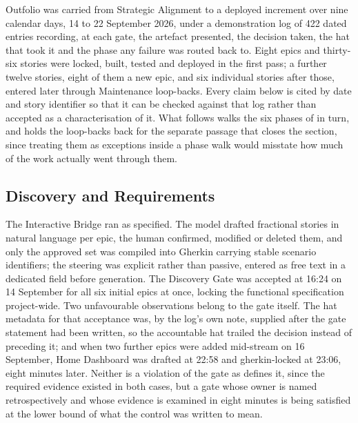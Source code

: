 
Outfolio was carried from Strategic Alignment to a deployed increment over nine calendar days, 14 to 22 September 2026, under a demonstration log of 422 dated entries recording, at each gate, the artefact presented, the decision taken, the hat that took it and the phase any failure was routed back to. Eight epics and thirty-six stories were locked, built, tested and deployed in the first pass; a further twelve stories, eight of them a new epic, and six individual stories after those, entered later through Maintenance loop-backs. Every claim below is cited by date and story identifier so that it can be checked against that log rather than accepted as a characterisation of it. What follows walks the six phases of  in turn, and holds the loop-backs back for the separate passage that closes the section, since treating them as exceptions inside a phase walk would misstate how much of the work actually went through them.

\subsection*{Discovery and Requirements}

The Interactive Bridge ran as specified. The model drafted fractional stories in natural language per epic, the human confirmed, modified or deleted them, and only the approved set was compiled into Gherkin carrying stable scenario identifiers; the steering was explicit rather than passive, entered as free text in a dedicated field before generation. The Discovery Gate was accepted at 16:24 on 14 September for all six initial epics at once, locking the functional specification project-wide. Two unfavourable observations belong to the gate itself. The hat metadata for that acceptance was, by the log's own note, supplied after the gate statement had been written, so the accountable hat trailed the decision instead of preceding it; and when two further epics were added mid-stream on 16 September, Home Dashboard was drafted at 22:58 and gherkin-locked at 23:06, eight minutes later. Neither is a violation of the gate as  defines it, since the required evidence existed in both cases, but a gate whose owner is named retrospectively and whose evidence is examined in eight minutes is being satisfied at the lower bound of what the control was written to mean.


